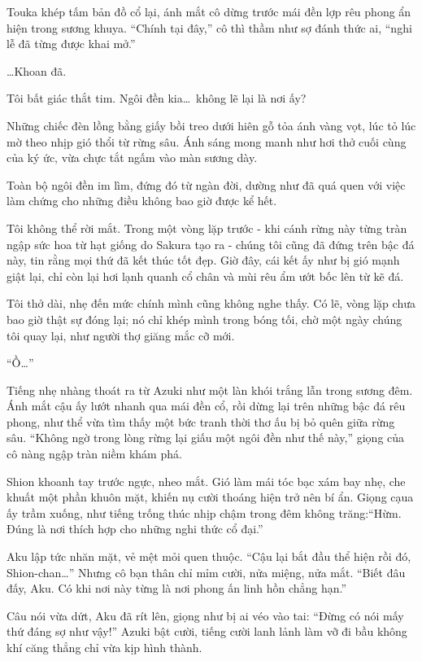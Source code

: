 \documentclass[../main.tex]{subfiles}
\begin{document}
Touka khép tấm bản đồ cổ lại, ánh mắt cô dừng trước mái đền lợp rêu phong ẩn hiện trong sương khuya. ``Chính tại đây,'' cô thì thầm như sợ đánh thức ai, ``nghi lễ đã từng được khai mở.''

\dots Khoan đã.

Tôi bất giác thắt tim. Ngôi đền kia\dots\ không lẽ lại là nơi ấy?

Những chiếc đèn lồng bằng giấy bồi treo dưới hiên gỗ tỏa ánh vàng vọt, lúc tỏ lúc mờ theo nhịp gió thổi từ rừng sâu. Ánh sáng mong manh như hơi thở cuối cùng của ký ức, vừa chực tắt ngấm vào màn sương dày.

Toàn bộ ngôi đền im lìm, đứng đó từ ngàn đời, dường như đã quá quen với việc làm chứng cho những điều không bao giờ được kể hết.

Tôi không thể rời mắt. Trong một vòng lặp trước - khi cánh rừng này từng tràn ngập sức hoa từ hạt giống do Sakura tạo ra - chúng tôi cũng đã đứng trên bậc đá này, tin rằng mọi thứ đã kết thúc tốt đẹp. Giờ đây, cái kết ấy như bị gió mạnh giật lại, chỉ còn lại hơi lạnh quanh cổ chân và mùi rêu ẩm ướt bốc lên từ kẽ đá.

Tôi thở dài, nhẹ đến mức chính mình cũng không nghe thấy. Có lẽ, vòng lặp chưa bao giờ thật sự đóng lại; nó chỉ khép mình trong bóng tối, chờ một ngày chúng tôi quay lại, như người thợ giăng mắc cỡ mới.

``Ồ\dots''

Tiếng nhẹ nhàng thoát ra từ Azuki như một làn khói trắng lẫn trong sương đêm. Ánh mắt cậu ấy lướt nhanh qua mái đền cổ, rồi dừng lại trên những bậc đá rêu phong, như thể vừa tìm thấy một bức tranh thời thơ ấu bị bỏ quên giữa rừng sâu. ``Không ngờ trong lòng rừng lại giấu một ngôi đền như thế này,'' giọng của cô nàng ngập tràn niềm khám phá.

Shion khoanh tay trước ngực, nheo mắt. Gió làm mái tóc bạc xám bay nhẹ, che khuất một phần khuôn mặt, khiến nụ cười thoáng hiện trở nên bí ẩn. Giọng cạua ấy trầm xuống, như tiếng trống thúc nhịp chậm trong đêm không trăng:``Hừm. Đúng là nơi thích hợp cho những nghi thức cổ đại.''

Aku lập tức nhăn mặt, vẻ mệt mỏi quen thuộc. ``Cậu lại bắt đầu thể hiện rồi đó, Shion-chan\dots'' Nhưng cô bạn thân chỉ mỉm cười, nửa miệng, nửa mắt. ``Biết đâu đấy, Aku. Có khi nơi này từng là nơi phong ấn linh hồn chẳng hạn.''

Câu nói vừa dứt, Aku đã rít lên, giọng như bị ai véo vào tai: ``Đừng có nói mấy thứ đáng sợ như vậy!'' Azuki bật cười, tiếng cười lanh lảnh làm vỡ đi bầu không khí căng thẳng chỉ vừa kịp hình thành.
\end{document}
